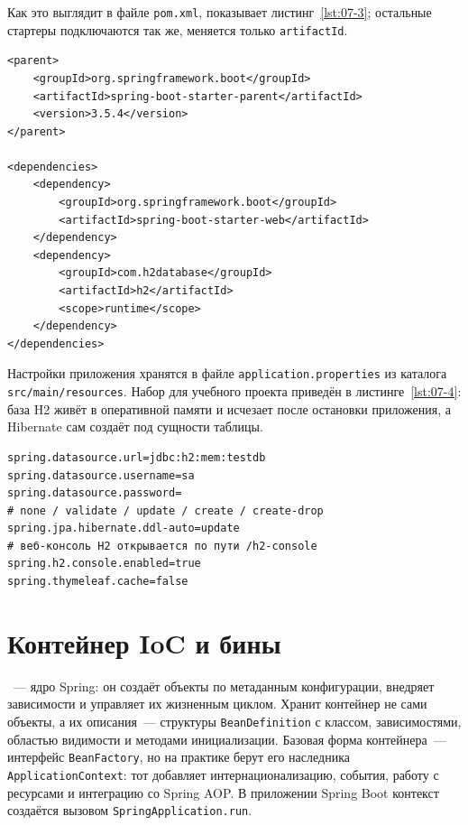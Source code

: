 Как это выглядит в файле \texttt{pom.xml}, показывает
листинг~\ref{lst:07-3}; остальные стартеры подключаются так же, меняется
только \texttt{artifactId}.

\begin{listing}[H]
\begin{verbatim}
<parent>
    <groupId>org.springframework.boot</groupId>
    <artifactId>spring-boot-starter-parent</artifactId>
    <version>3.5.4</version>
</parent>

<dependencies>
    <dependency>
        <groupId>org.springframework.boot</groupId>
        <artifactId>spring-boot-starter-web</artifactId>
    </dependency>
    <dependency>
        <groupId>com.h2database</groupId>
        <artifactId>h2</artifactId>
        <scope>runtime</scope>
    </dependency>
</dependencies>
\end{verbatim}
\caption{Описание проекта в файле pom.xml}
\label{lst:07-3}
\end{listing}

Настройки приложения хранятся в файле \texttt{application.properties} из
каталога \texttt{src/main/resources}. Набор для учебного проекта приведён в
листинге~\ref{lst:07-4}: база H2 живёт в оперативной памяти и
исчезает после остановки приложения, а Hibernate сам создаёт под сущности
таблицы.

\begin{listing}[H]
\begin{verbatim}
spring.datasource.url=jdbc:h2:mem:testdb
spring.datasource.username=sa
spring.datasource.password=
# none / validate / update / create / create-drop
spring.jpa.hibernate.ddl-auto=update
# веб-консоль H2 открывается по пути /h2-console
spring.h2.console.enabled=true
spring.thymeleaf.cache=false
\end{verbatim}
\caption{Файл application.properties}
\label{lst:07-4}
\end{listing}

\section{Контейнер IoC и бины}

~--- ядро Spring: он создаёт объекты по метаданным
конфигурации, внедряет зависимости и управляет их жизненным циклом. Хранит
контейнер не сами объекты, а их описания~--- структуры
\texttt{BeanDefinition} с классом, зависимостями, областью видимости и
методами инициализации. Базовая форма контейнера~---
интерфейс \texttt{BeanFactory}, но на практике берут его наследника
\texttt{ApplicationContext}: тот добавляет интернационализацию, события, работу
с ресурсами и интеграцию со Spring AOP. В приложении Spring Boot контекст
создаётся вызовом \texttt{SpringApplication.run}.

